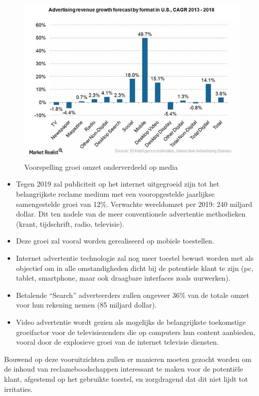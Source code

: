 \documentclass[pdftex,a4paper,12pt,twoside]{report}
\begin{document}
\begin{figure}[h!]
\centering
\includegraphics[width=12cm]{img/advRevGrowthFormat}
\caption{Voorspelling groei omzet onderverdeeld op media}
\label{fig: Advertising revenue growth forecast by format}
\end{figure} 

\begin{itemize}
	\item 	Tegen 2019 zal publiciteit op het internet uitgegroeid zijn tot het belangrijkste reclame medium met een vooropgestelde jaarlijkse samengestelde groei van 	12\%. Verwachte wereldomzet per 2019: 240 miljard dollar. Dit ten nadele van de meer conventionele advertentie methodieken (krant, tijdschrift, radio, televisie).
	
	\item	Deze groei zal vooral worden gerealiseerd op mobiele toestellen.
	\item	Internet advertentie technologie zal nog meer toestel bewust worden met als objectief om in alle omstandigheden dicht bij de potentiele klant te zijn (pc, tablet, smartphone, maar ook draagbare interfaces zoals uurwerken).
	\item	Betalende “Search” adverteerders zullen ongeveer 36\% van de totale omzet voor hun rekening nemen (85 miljard dollar).
	\item	Video advertentie wordt gezien als mogelijks de belangrijkste toekomstige groeifactor voor de televisiezenders die op computers hun content aanbieden, vooral door de explosieve groei van de internet televisie diensten.
\end{itemize}
Bouwend op deze vooruitzichten zullen er manieren moeten gezocht worden om de inhoud van reclameboodschappen interessant te maken voor de potentiële klant, afgestemd op het gebruikte toestel, en zorgdragend dat dit niet lijdt tot irritaties. 
\end{document}

